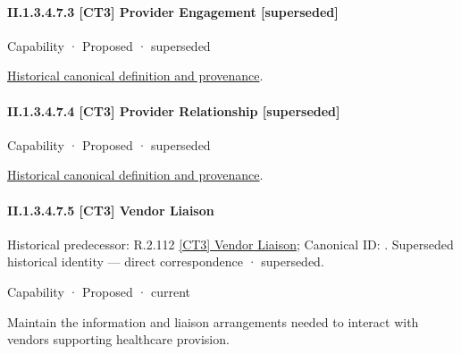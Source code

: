 \paragraph*{II.1.3.4.7.3 [CT3] Provider Engagement [superseded]}
\label{navigation:II.1.3.4.7.3}

\label{element:a0777dbd9b0c4528817e99a7f34aa444}
{\small Capability · Proposed · superseded}\par
\href{../../../../../../../continuum/strategy/capability/a0777dbd9b0c4528817e99a7f34aa444.md}{Historical canonical definition and provenance}.\par
\paragraph*{II.1.3.4.7.4 [CT3] Provider Relationship [superseded]}
\label{navigation:II.1.3.4.7.4}

\label{element:3bb8a3d5b62a4b779442290fe8d5106c}
{\small Capability · Proposed · superseded}\par
\href{../../../../../../../continuum/strategy/capability/3bb8a3d5b62a4b779442290fe8d5106c.md}{Historical canonical definition and provenance}.\par
\paragraph*{II.1.3.4.7.5 [CT3] Vendor Liaison}
\label{navigation:II.1.3.4.7.5}

{\small Historical predecessor: R.2.112 \hyperref[element:29076cbb9fc5442fb25faf43947574f7]{[CT3] Vendor Liaison}; Canonical ID: \texttt{}. Superseded historical identity — direct correspondence · superseded.}\par
\label{element:66358bd6698e4050b12342522fbbb923}
{\small Capability · Proposed · current}\par

Maintain the information and liaison arrangements needed to interact with vendors supporting healthcare provision.




